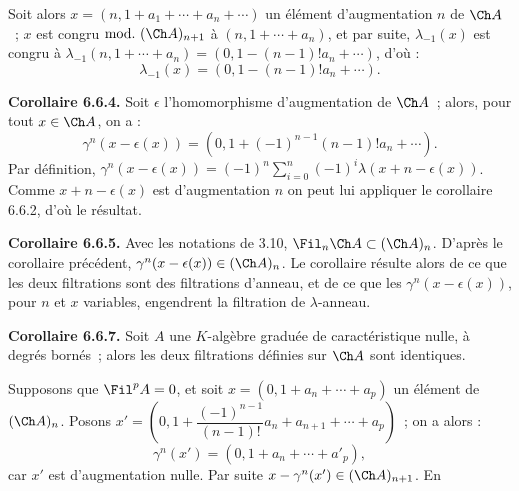 Soit alors \(x=(n,1+a_1+\cdots+a_n+\cdots)\) un élément d'augmentation \(n\) de \(\Ch A\)~; \(x\) est congru \(\mathrm{mod.}\ (\Ch A)_{n+1}\) à \((n,1+\cdots+a_n)\), et par suite, \(\lambda_{-1}(x)\) est congru à \(\lambda_{-1}(n,1+\cdots+a_n)=(0,1-(n-1)!a_n+\cdots)\), d'où :
\[
  \lambda_{-1}(x)=(0,1-(n-1)!a_n+\cdots).
\]

\textbf{Corollaire 6.6.4.} Soit \(\epsilon\) l'homomorphisme d'augmentation de \(\Ch A\)~; alors, pour tout \(x\in\Ch A\), on a :
\[
  \gamma^n(x-\epsilon(x))
  =
  (0,1+(-1)^{n-1}(n-1)!a_n+\cdots).
\]
Par définition, \(\gamma^n(x-\epsilon(x))=(-1)^n\sum_{i=0}^n(-1)^i\lambda(x+n-\epsilon(x))\). Comme \(x+n-\epsilon(x)\) est d'augmentation \(n\) on peut lui appliquer le corollaire 6.6.2, d'où le résultat.

\textbf{Corollaire 6.6.5.} Avec les notations de 3.10, \(\Fil_n\Ch A\subset(\Ch A)_n\). D'après le corollaire précédent, \(\gamma^n(x-\epsilon(x))\in(\Ch A)_n\). Le corollaire résulte alors de ce que les deux filtrations sont des filtrations d'anneau, et de ce que les \(\gamma^n(x-\epsilon(x))\), pour \(n\) et \(x\) variables, engendrent la filtration de \(\lambda\)-anneau.

\textbf{Corollaire 6.6.7.} Soit \(A\) une \(K\)-algèbre graduée de caractéristique nulle, à degrés bornés~; alors les deux filtrations définies sur \(\Ch A\) sont identiques.

Supposons que \(\Fil^pA=0\), et soit \(x=(0,1+a_n+\cdots+a_p)\) un élément de \((\Ch A)_n\). Posons \(x'=\left(0,1+\dfrac{(-1)^{n-1}}{(n-1)!}a_n+a_{n+1}+\cdots+a_p\right)\)~; on a alors :
\[
  \gamma^n(x')=(0,1+a_n+\cdots+a'_p),
\]
car \(x'\) est d'augmentation nulle. Par suite \(x-\gamma^n(x')\in(\Ch A)_{n+1}\). En
